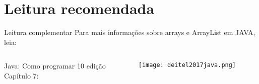 \documentclass[11pt,aspectratio=43,ignorenonframetext,t]{beamer}
\begin{document}
\section{Leitura recomendada}
\begin{frame}{Leitura complementar}
 Para mais informações sobre arrays e ArrayList em JAVA, leia:\\
 \begin{columns}
   \begin{column}{0.4\textwidth}
     Java: Como programar 10{\textordfeminine} edição\\
     Capítulo 7: \cite{deitel2017java}\\
   \end{column}
   \begin{column}{0.3\textwidth}
    \begin{center}
  \texttt{[image: deitel2017java.png]} \\
 \end{center}
   \end{column}
 \end{columns}
\end{frame}
\end{document}
